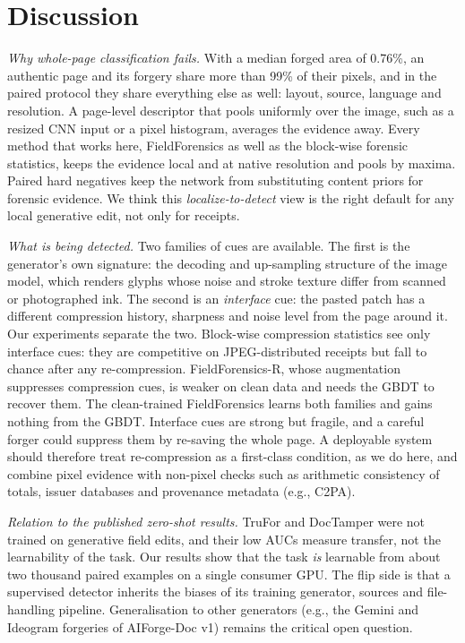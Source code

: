 \documentclass[conference]{IEEEtran}
\begin{document}
\section{Discussion}\label{sec:disc}
\emph{Why whole-page classification fails.} With a median forged area of 0.76\%, an authentic page and its forgery share more than 99\% of their pixels, and in the paired protocol they share everything else as well: layout, source, language and resolution. A page-level descriptor that pools uniformly over the image, such as a resized CNN input or a pixel histogram, averages the evidence away. Every method that works here, FieldForensics as well as the block-wise forensic statistics, keeps the evidence local and at native resolution and pools by maxima. Paired hard negatives keep the network from substituting content priors for forensic evidence. We think this \emph{localize-to-detect} view is the right default for any local generative edit, not only for receipts.

\emph{What is being detected.} Two families of cues are available. The first is the generator's own signature: the decoding and up-sampling structure of the image model, which renders glyphs whose noise and stroke texture differ from scanned or photographed ink. The second is an \emph{interface} cue: the pasted patch has a different compression history, sharpness and noise level from the page around it. Our experiments separate the two. Block-wise compression statistics see only interface cues: they are competitive on JPEG-distributed receipts but fall to chance after any re-compression. FieldForensics-R, whose augmentation suppresses compression cues, is weaker on clean data and needs the GBDT to recover them. The clean-trained FieldForensics learns both families and gains nothing from the GBDT. Interface cues are strong but fragile, and a careful forger could suppress them by re-saving the whole page. A deployable system should therefore treat re-compression as a first-class condition, as we do here, and combine pixel evidence with non-pixel checks such as arithmetic consistency of totals, issuer databases and provenance metadata (e.g., C2PA).

\emph{Relation to the published zero-shot results.} TruFor and DocTamper were not trained on generative field edits, and their low AUCs \cite{aiforge2} measure transfer, not the learnability of the task. Our results show that the task \emph{is} learnable from about two thousand paired examples on a single consumer GPU. The flip side is that a supervised detector inherits the biases of its training generator, sources and file-handling pipeline. Generalisation to other generators (e.g., the Gemini and Ideogram forgeries of AIForge-Doc v1) remains the critical open question.
\end{document}
